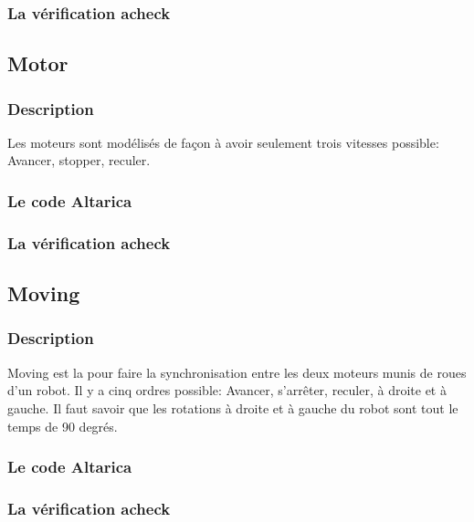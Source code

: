    \subsubsection{La vérification acheck}
   
  \subsection{Motor}
  
   \subsubsection{Description}
   Les moteurs sont modélisés de façon à avoir seulement trois vitesses
   possible: Avancer, stopper, reculer.

   \subsubsection{Le code Altarica}
   
   
   \subsubsection{La vérification acheck}
   
   
  \subsection{Moving}

   \subsubsection{Description}
  Moving est la pour faire la synchronisation entre les deux moteurs munis de roues d'un robot. Il y a cinq ordres possible: Avancer, s'arrêter, reculer, à droite et à gauche. Il faut savoir que les rotations à droite et à gauche du robot sont tout le temps de 90 degrés.

   \subsubsection{Le code Altarica}
   
   
   \subsubsection{La vérification acheck}
   
 
